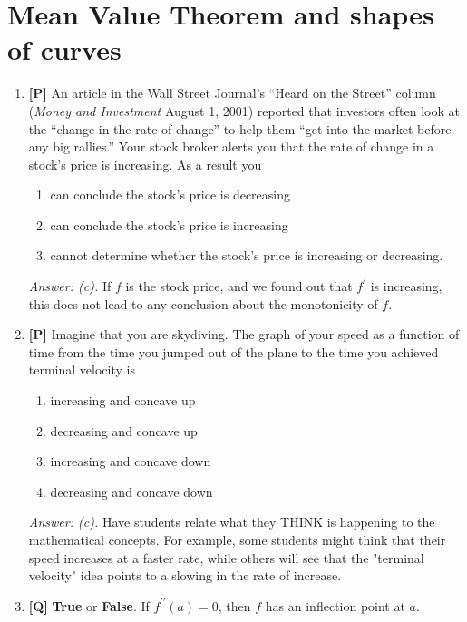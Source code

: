 \documentclass[12pt]{article}
\begin{document}
\pagebreak
\section{Mean Value Theorem and shapes of curves}

\begin{enumerate}

\item {\bf [P]} An article in the Wall Street Journal's ``Heard on the Street'' 
column (\emph{Money and Investment} August 1, 2001) reported that
investors often look at the ``change in the rate of change'' to help
them ``get into the market before any big rallies.''  Your stock
broker alerts you that the rate of change in a stock's price is
increasing.  As a result you
\begin{enumerate}
\item can conclude the stock's price is decreasing
\item can conclude the stock's price is increasing
\item cannot determine whether the stock's price is increasing or decreasing.
\end{enumerate}

{\it Answer: (c).} If $f$ is the stock price, and we found out that
 $f^{\prime}$ is increasing, this does not lead to any conclusion about 
the monotonicity of $f$.

\bigskip

\item {\bf [P]} Imagine that you are skydiving.  The graph of your speed
as a function of time from the time you jumped out of the plane to the
time you achieved terminal velocity is
\begin{enumerate}
\item increasing and concave up
\item decreasing and concave up
\item increasing and concave down
\item decreasing and concave down
\end{enumerate}

{\it Answer: (c).} Have students relate what they THINK is happening to the mathematical concepts. For example, some students might 
think that their speed increases at a faster rate, while others will see that the "terminal velocity" idea 
points to a slowing in the rate of increase. 

\bigskip 

\item {\bf [Q]} \textbf{True} or \textbf{False}. If $f^{\prime \prime} (a)=0$, then $f$ has an inflection point at $a$.


\end{enumerate}
\end{document}

